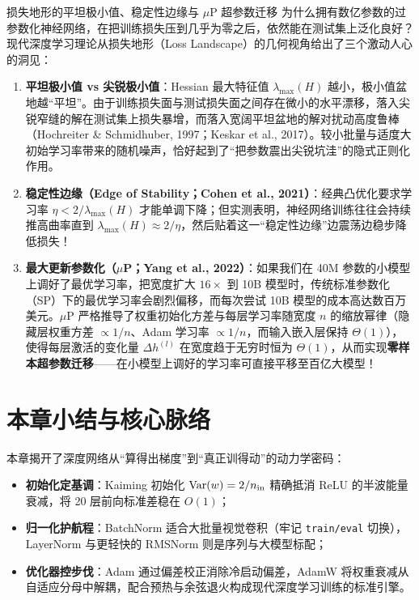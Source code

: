 \begin{extBox}{损失地形的平坦极小值、稳定性边缘与 $\mu$P 超参数迁移}
为什么拥有数亿参数的过参数化神经网络，在把训练损失压到几乎为零之后，依然能在测试集上泛化良好？现代深度学习理论从损失地形（Loss Landscape）的几何视角给出了三个激动人心的洞见：
\begin{enumerate}
  \item \textbf{平坦极小值 vs 尖锐极小值}：Hessian 最大特征值 $\lambda_{\max}(H)$ 越小，极小值盆地越“平坦”。由于训练损失面与测试损失面之间存在微小的水平漂移，落入尖锐窄缝的解在测试集上损失暴增，而落入宽阔平坦盆地的解对扰动高度鲁棒（Hochreiter \& Schmidhuber, 1997；Keskar et al., 2017）。较小批量与适度大初始学习率带来的随机噪声，恰好起到了“把参数震出尖锐坑洼”的隐式正则化作用。
  \item \textbf{稳定性边缘（Edge of Stability；Cohen et al., 2021）}：经典凸优化要求学习率 $\eta < 2/\lambda_{\max}(H)$ 才能单调下降；但实测表明，神经网络训练往往会持续推高曲率直到 $\lambda_{\max}(H) \approx 2/\eta$，然后贴着这一“稳定性边缘”边震荡边稳步降低损失！
  \item \textbf{最大更新参数化（$\mu$P；Yang et al., 2022）}：如果我们在 40M 参数的小模型上调好了最优学习率，把宽度扩大 $16\times$ 到 10B 模型时，传统标准参数化（SP）下的最优学习率会剧烈偏移，而每次尝试 10B 模型的成本高达数百万美元。$\mu$P 严格推导了权重初始化方差与每层学习率随宽度 $n$ 的缩放幂律（隐藏层权重方差 $\propto 1/n$、Adam 学习率 $\propto 1/n$，而输入嵌入层保持 $\Theta(1)$），使得每层激活的变化量 $\Delta h^{(l)}$ 在宽度趋于无穷时恒为 $\Theta(1)$，从而实现\textbf{零样本超参数迁移}——在小模型上调好的学习率可直接平移至百亿大模型！
\end{enumerate}
\end{extBox}

\section*{本章小结与核心脉络}

本章揭开了深度网络从“算得出梯度”到“真正训得动”的动力学密码：
\begin{itemize}
  \item \textbf{初始化定基调}：Kaiming 初始化 $\operatorname{Var}(w) = 2/n_{\text{in}}$ 精确抵消 ReLU 的半波能量衰减，将 20 层前向标准差稳在 $O(1)$；
  \item \textbf{归一化护航程}：BatchNorm 适合大批量视觉卷积（牢记 \texttt{train/eval} 切换），LayerNorm 与更轻快的 RMSNorm 则是序列与大模型标配；
  \item \textbf{优化器控步伐}：Adam 通过偏差校正消除冷启动偏差，AdamW 将权重衰减从自适应分母中解耦，配合预热与余弦退火构成现代深度学习训练的标准引擎。
\end{itemize}

